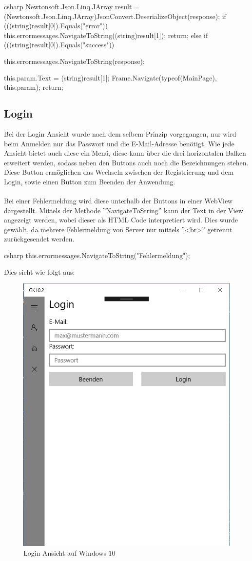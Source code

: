 \begin{code}{csharp}
Newtonsoft.Json.Linq.JArray result = (Newtonsoft.Json.Linq.JArray)JsonConvert.DeserializeObject(response);
if (((string)result[0]).Equals("error"))
{
	this.errormessages.NavigateToString((string)result[1]);
	return;
}
else if (((string)result[0]).Equals("success"))
{
	this.errormessages.NavigateToString(response);
	
	this.param.Text = (string)result[1];
	Frame.Navigate(typeof(MainPage), this.param);
	return;
}
\end{code}

\subsection{Login}

Bei der Login Ansicht wurde nach dem selbem Prinzip vorgegangen, nur wird beim Anmelden nur das Passwort und die E-Mail-Adresse benötigt. Wie jede Ansicht bietet auch diese ein Menü, diese kann über die drei horizontalen Balken erweitert werden, sodass neben den Buttons auch noch die Bezeichnungen stehen. Diese Button ermöglichen das Wechseln zwischen der Registrierung und dem Login, sowie einen Button zum Beenden der Anwendung. 
\\\\
Bei einer Fehlermeldung wird diese unterhalb der Buttons in einer WebView dargestellt. Mittels der Methode ''NavigateToString'' kann der Text in der View angezeigt werden, wobei dieser als HTML Code interpretiert wird. Dies wurde gewählt, da mehrere Fehlermeldung von Server nur mittels ''<br>'' getrennt zurückgesendet werden.

\begin{code}{csharp}
	this.errormessages.NavigateToString("Fehlermeldung");
\end{code}

Dies sieht wie folgt aus:

\begin{figure}[H]
	\centering
	\includegraphics[width=0.5\linewidth]{images/screenshot005}
	\caption{Login Ansicht auf Windows 10}
	\label{fig:screenshot005}
\end{figure}

